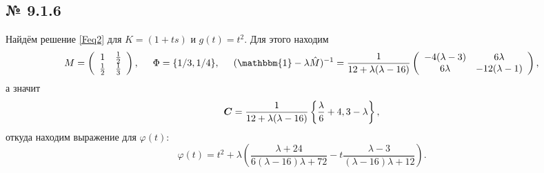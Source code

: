 \subsection*{№ 9.1.6}

Найдём решение \eqref{Feq2} для $K = (1 + ts)$ и $g(t) = t^2$. 
Для этого находим
\begin{equation*}
	M = \left(
\begin{array}{cc}
 1 & \frac{1}{2} \\
 \frac{1}{2} & \frac{1}{3} \\
\end{array}
\right),
\hspace{5 mm} 
\Phi = \{1/3, 1/4\},
\hspace{5 mm} 
(\mathbbm{1} - \lambda \hat{M})^{-1} = 
\frac{1}{12 + \lambda (\lambda-16)}
\left(
\begin{array}{cc}
 -4 (\lambda -3) & 6 \lambda  \\
 6 \lambda  & -12 (\lambda -1) \\
\end{array}
\right)
,
\end{equation*}
а значит
\begin{equation*}
	\mbox{\boldmath $C$} = \frac{1}{12 + \lambda (\lambda-16)}\left\{\frac{\lambda }{6}+4,3-\lambda \right\},
\end{equation*}
откуда находим выражение для $\varphi(t)$:
\begin{equation*}
	\varphi(t) = t^2 + \lambda \left(\frac{\lambda +24}{6 (\lambda -16) \lambda +72}- t \frac{\lambda -3}{(\lambda -16) \lambda +12}\right).
\end{equation*}